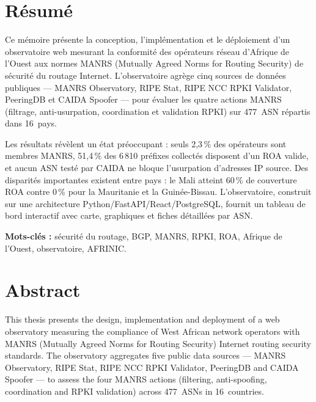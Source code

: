 \documentclass{eneam}
\begin{document}
\listoffigures
\listoftables

\chapter*{Résumé}

Ce mémoire présente la conception, l'implémentation et le déploiement d'un observatoire web mesurant la conformité des opérateurs réseau d'Afrique de l'Ouest aux normes MANRS (Mutually Agreed Norms for Routing Security) de sécurité du routage Internet. L'observatoire agrège cinq sources de données publiques --- MANRS Observatory, RIPE Stat, RIPE NCC RPKI Validator, PeeringDB et CAIDA Spoofer --- pour évaluer les quatre actions MANRS (filtrage, anti-usurpation, coordination et validation RPKI) sur 477~ASN répartis dans 16~pays.

Les résultats révèlent un état préoccupant : seuls 2,3\,\% des opérateurs sont membres MANRS, 51,4\,\% des 6\,810 préfixes collectés disposent d'un ROA valide, et aucun ASN testé par CAIDA ne bloque l'usurpation d'adresses IP source. Des disparités importantes existent entre pays : le Mali atteint 60\,\% de couverture ROA contre 0\,\% pour la Mauritanie et la Guinée-Bissau. L'observatoire, construit sur une architecture Python/FastAPI/React/PostgreSQL, fournit un tableau de bord interactif avec carte, graphiques et fiches détaillées par ASN.

\textbf{Mots-clés :} sécurité du routage, BGP, MANRS, RPKI, ROA, Afrique de l'Ouest, observatoire, AFRINIC.

\chapter*{Abstract}

This thesis presents the design, implementation and deployment of a web observatory measuring the compliance of West African network operators with MANRS (Mutually Agreed Norms for Routing Security) Internet routing security standards. The observatory aggregates five public data sources --- MANRS Observatory, RIPE Stat, RIPE NCC RPKI Validator, PeeringDB and CAIDA Spoofer --- to assess the four MANRS actions (filtering, anti-spoofing, coordination and RPKI validation) across 477~ASNs in 16~countries.
\end{document}

